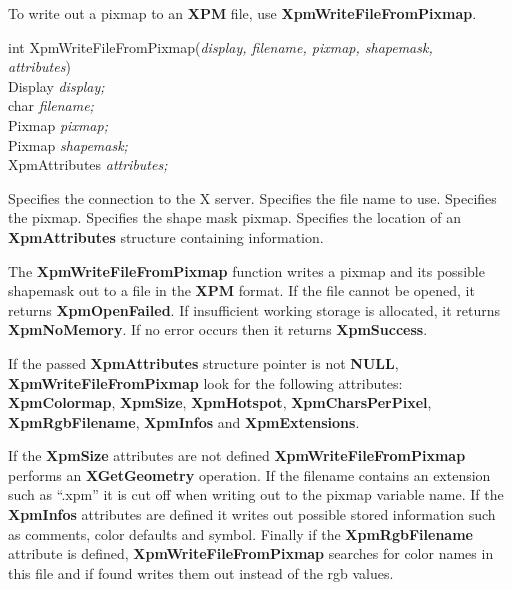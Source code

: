 \vspace{.5cm}
To write out a pixmap to an {\bf XPM} file, use {\bf XpmWriteFileFromPixmap}.

\begin{flushleft} 

int XpmWriteFileFromPixmap({\it display, filename, pixmap, shapemask,\\
\hspace{3cm}attributes})\\

\hspace{1cm}Display {\it *display;}\\
\hspace{1cm}char {\it *filename;}\\
\hspace{1cm}Pixmap {\it pixmap;}\\
\hspace{1cm}Pixmap {\it shapemask;}\\
\hspace{1cm}XpmAttributes {\it *attributes;}

\end{flushleft}

\begin{description}

 Specifies the connection to the X server.
 Specifies the file name to use.
 Specifies the pixmap.
 Specifies the shape mask pixmap.
 Specifies the location of an {\bf XpmAttributes} structure
containing information.

\end{description} 

The {\bf XpmWriteFileFromPixmap} function writes a pixmap and its possible
shapemask out to a file in the {\bf XPM} format. If the file cannot be opened,
it returns {\bf XpmOpenFailed}. If insufficient working storage is
allocated, it returns {\bf XpmNoMemory}. If no error occurs then it
returns {\bf XpmSuccess}.

If the passed {\bf XpmAttributes} structure pointer is not {\bf NULL}, {\bf
XpmWriteFileFromPixmap} look for the following attributes: {\bf XpmColormap},
{\bf XpmSize}, {\bf XpmHotspot}, {\bf XpmCharsPerPixel}, {\bf XpmRgbFilename},
{\bf XpmInfos} and {\bf XpmExtensions}.

If the {\bf XpmSize} attributes are not defined {\bf XpmWriteFileFromPixmap}
performs an {\bf XGetGeometry} operation. If the filename contains an
extension such as ``.xpm'' it is cut off when writing out to the pixmap
variable name. If the {\bf XpmInfos} attributes are defined it writes out
possible stored information such as comments, color defaults and symbol.
Finally if the {\bf XpmRgbFilename} attribute is defined, {\bf
XpmWriteFileFromPixmap} searches for color names in this file and if found
writes them out instead of the rgb values.

